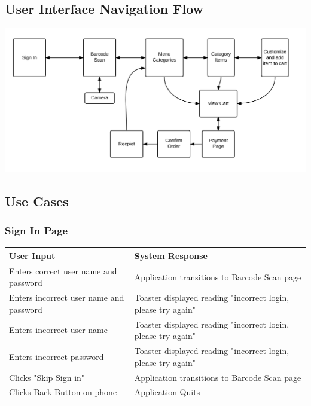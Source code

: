 \documentclass[12pt, titlepage]{article}
\begin{document}
\subsection{User Interface Navigation Flow}

\includegraphics[width=180mm,scale=0.5]{UIProcess.png}

\subsection{Use Cases}

\subsubsection{Sign In Page}
\begin{center}
    \begin{tabular}{ | l | p{8cm} |}
    \hline
    User Input & System Response \\ \hline
    Enters correct user name and password & Application transitions to Barcode Scan page \\ \hline
    Enters incorrect user name and password & Toaster displayed reading "incorrect login, please try again" \\ \hline
    Enters incorrect user name & Toaster displayed reading "incorrect login, please try again" \\ \hline
    Enters incorrect password & Toaster displayed reading "incorrect login, please try again" \\ \hline
    Clicks "Skip Sign in" & Application  transitions to Barcode Scan page\\ \hline
    Clicks Back Button on phone & Application Quits \\
    \hline
    \end{tabular}
\end{center}
\end{document}

